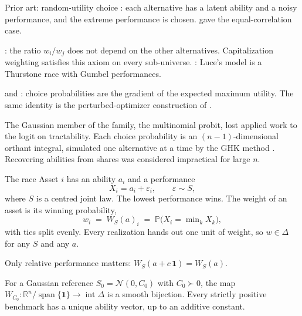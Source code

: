 \documentclass[aspectratio=169,11pt]{beamer}
\newcommand{\R}{\mathbb{R}}
\newcommand{\Prob}{\mathbb{P}}
\newcommand{\one}{\mathbf{1}}
\begin{document}
\begin{frame}{Prior art: random-utility choice}
\textcite{thurstone1927}: each alternative has a latent ability and a noisy
performance, and the extreme performance is chosen. \textcite{mosteller1951}
gave the equal-correlation case.

\textcite{luce1959}: the ratio $w_i/w_j$ does not depend on the other
alternatives. Capitalization weighting satisfies this axiom on every
sub-universe. \textcite{yellott1977}: Luce's model is a Thurstone race with
Gumbel performances.

\textcite{williams1977} and \textcite{mcfadden1981}: choice probabilities are
the gradient of the expected maximum utility. The same identity is the
perturbed-optimizer construction of \textcite{berthet2020}.

The Gaussian member of the family, the multinomial probit, lost applied work to
the logit on tractability. Each choice probability is an $(n-1)$-dimensional
orthant integral, simulated one alternative at a time by the GHK method
\parencite{geweke1989,keane1994,hajivassiliou1996}. Recovering abilities from
shares was considered impractical for large $n$.
\end{frame}

\begin{frame}{The race}
Asset $i$ has an ability $a_i$ and a performance
\[
  X_i = a_i + \varepsilon_i, \qquad \varepsilon \sim S ,
\]
where $S$ is a centred joint law. The lowest performance wins. The weight of an
asset is its winning probability,
\[
  w_i \;=\; W_S(a)_i \;=\; \Prob\big(X_i = \min\nolimits_k X_k\big),
\]
with ties split evenly. Every realization hands out one unit of weight, so
$w\in\Delta$ for any $S$ and any $a$.

Only relative performance matters: $W_S(a + c\,\one) = W_S(a)$.

\begin{lemma}[Calibration]
For a Gaussian reference $S_0 = \mathcal N(0,C_0)$ with $C_0\succ0$, the map
$W_{C_0}:\R^n/\operatorname{span}\{\one\}\to\operatorname{int}\Delta$ is a smooth
bijection. Every strictly positive benchmark has a unique ability vector, up to
an additive constant.
\end{lemma}
\end{frame}
\end{document}
